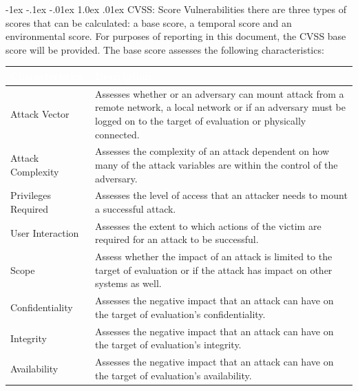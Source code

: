 \documentclass{article}
\makeatletter
\renewcommand{\section}{\@startsection{section}{1}{\z@}%
            {-1ex \@plus -.1ex \@minus -.01ex}%
            {1.0ex \@plus  .01ex}%
            {\normalfont\large\bfseries\color{sectioncolor}}}
\makeatother
\begin{document}
            \section{\large CVSS: Score Vulnerabilities}
            \large there are three types of scores that can be calculated: a base score, a temporal score and an environmental score. For purposes of reporting in this document, the CVSS base score will be provided. The base score assesses the following characteristics:
            \begin{center}
                \begin{longtable} {|p{8em}|p{30em}|}
                \hline 
                \large \cellcolor{tablecol} \textcolor{white}{\textbf{Characteristics}} & \large \cellcolor{tablecol} \textcolor{white}{\textbf{Description}}   \\    
                \hline
                \normalsize Attack Vector & \normalsize Assesses whether or an adversary can mount attack from a remote network, a local
                network or if an adversary must be logged on to the target of evaluation or physically
                connected.  \\
                \hline
                \normalsize Attack Complexity  & \normalsize Assesses the complexity of an attack dependent on how many of the attack variables are
                within the control of the adversary.  \\
                \hline
                \normalsize Privileges Required  & \normalsize Assesses the level of access that an attacker needs to mount a successful attack. \\
                \hline
                \normalsize User Interaction & \normalsize Assesses the extent to which actions of the victim are required for an attack to be
                successful. \\
                \hline
                \normalsize Scope & \normalsize Assess whether the impact of an attack is limited to the target of evaluation or if the attack
                has impact on other systems as well. \\
                \hline
                \normalsize Confidentiality & \normalsize Assesses the negative impact that an attack can have on the target of evaluation's
                confidentiality. \\
                \hline
                \normalsize Integrity & \normalsize Assesses the negative impact that an attack can have on the target of evaluation's
                integrity. \\
                \hline
                \normalsize Availability & \normalsize Assesses the negative impact that an attack can have on the target of evaluation's
                availability. \\
                \hline
                \end{longtable}   
            \end{center} 
\end{document}
